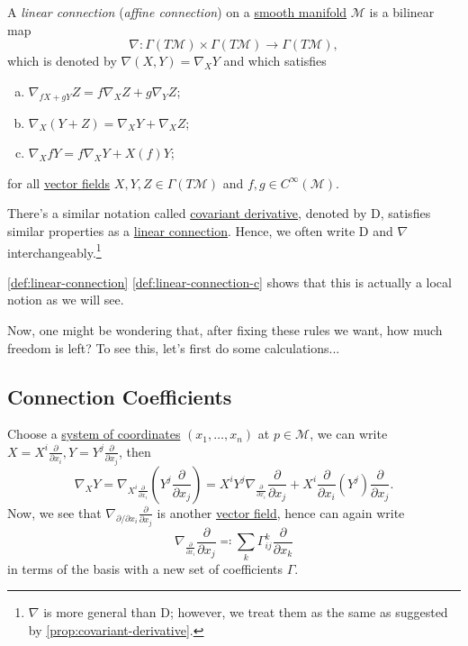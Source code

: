 \begin{definition}\label{def:linear-connection}
	A \emph{linear connection} (\emph{affine connection}) on a \hyperref[def:smooth-manifold]{smooth manifold} \(\mathcal{M}\) is a bilinear map
	\[
		\nabla \colon \Gamma (T \mathcal{M} ) \times \Gamma (T \mathcal{M} ) \to \Gamma (T \mathcal{M} ),
	\]
	which is denoted by \(\nabla (X, Y) = \nabla _X Y\) and which satisfies
	\begin{enumerate}[(a)]
		\item \(\nabla _{fX+gY}Z = f \nabla _X Z + g \nabla _Y Z\);
		\item \(\nabla _X (Y+Z) = \nabla _X Y + \nabla _X Z\);
		      \item\label{def:linear-connection-c} \(\nabla _X fY = f \nabla _X Y + X(f)Y\);
	\end{enumerate}
	for all \hyperref[def:vector-field]{vector fields} \(X, Y, Z\in \Gamma (T \mathcal{M} )\) and \(f, g\in C^{\infty} (\mathcal{M} )\).
\end{definition}

\begin{note}
	There's a similar notation called \hyperref[def:covariant-derivative]{covariant derivative}, denoted by \(\mathrm{D} \), satisfies similar properties as a \hyperref[def:linear-connection]{linear connection}. Hence, we often write \(\mathrm{D} \) and \(\nabla \) interchangeably.\footnote{\(\nabla \) is more general than \(\mathrm{D}\); however, we treat them as the same as suggested by \autoref{prop:covariant-derivative}.}
\end{note}

\begin{remark}
	\autoref{def:linear-connection} \autoref{def:linear-connection-c} shows that this is actually a local notion as we will see.
\end{remark}

Now, one might be wondering that, after fixing these rules we want, how much freedom is left? To see this, let's first do some calculations...

\subsection{Connection Coefficients}
Choose a \hyperref[def:coordinate-chart]{system of coordinates} \((x_1, \ldots , x_n)\) at \(p\in \mathcal{M} \), we can write \(X = X^i \frac{\partial }{\partial x_i}, Y = Y^j \frac{\partial }{\partial x_j}\), then
\[
	\nabla _X Y
	= \nabla _{X^i \frac{\partial }{\partial x_i} } \left( Y^j \frac{\partial }{\partial x_j}  \right)
	= X^i Y^j \nabla _{\frac{\partial }{\partial x_i}} \frac{\partial }{\partial x_j} + X^i \frac{\partial }{\partial x_i}(Y^j)  \frac{\partial }{\partial x_j}.
\]
Now, we see that \(\nabla _{\partial / \partial x_i} \frac{\partial }{\partial x_j}\) is another \hyperref[def:vector-field]{vector field}, hence can again write
\[
	\nabla _{\frac{\partial }{\partial x_i}} \frac{\partial }{\partial x_j} \eqqcolon \sum_{k} \Gamma ^k_{ij} \frac{\partial }{\partial x_k}
\]
in terms of the basis with a new set of coefficients \(\Gamma \).


